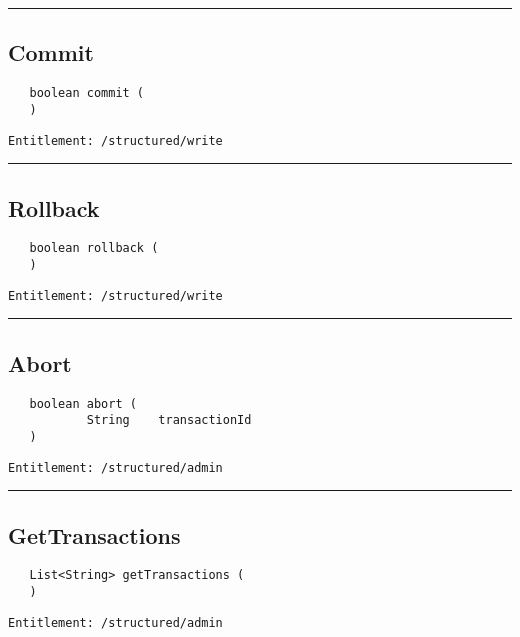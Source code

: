 \rule{12cm}{2pt}
\subsection{Commit}
\label{Api:Commit}
\begin{verbatim}
   boolean commit (
   )
\end{verbatim}
\begin{Verbatim}[fontsize=\small, formatcom=\color{Maroon}]
  Entitlement: /structured/write
\end{Verbatim}



\rule{12cm}{2pt}
\subsection{Rollback}
\label{Api:Rollback}
\begin{verbatim}
   boolean rollback (
   )
\end{verbatim}
\begin{Verbatim}[fontsize=\small, formatcom=\color{Maroon}]
  Entitlement: /structured/write
\end{Verbatim}



\rule{12cm}{2pt}
\subsection{Abort}
\label{Api:Abort}
\begin{verbatim}
   boolean abort (
           String    transactionId
   )
\end{verbatim}
\begin{Verbatim}[fontsize=\small, formatcom=\color{Maroon}]
  Entitlement: /structured/admin
\end{Verbatim}



\rule{12cm}{2pt}
\subsection{GetTransactions}
\label{Api:GetTransactions}
\begin{verbatim}
   List<String> getTransactions (
   )
\end{verbatim}
\begin{Verbatim}[fontsize=\small, formatcom=\color{Maroon}]
  Entitlement: /structured/admin
\end{Verbatim}



